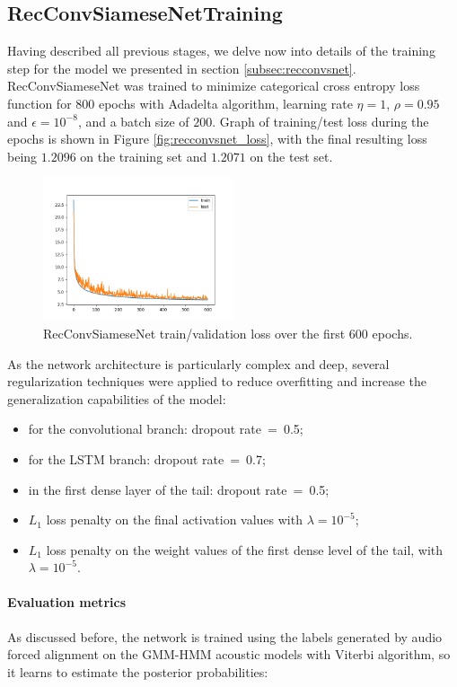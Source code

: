 \subsection{RecConvSiameseNetTraining}\label{subsec:recconvsnet_train}
Having described all previous stages, we delve now into details of the training step for the model we presented in section \vref{subsec:recconvsnet}.
RecConvSiameseNet was trained to minimize categorical cross entropy loss function for $800$ epochs with Adadelta algorithm, learning rate $\eta = 1$, $\rho=0.95$ and $\epsilon=10^{-8}$, and a batch size of $200$. Graph of training/test loss during the epochs is shown in Figure \vref{fig:recconvsnet_loss}, with the final resulting loss being $1.2096$ on the training set and $1.2071$ on the test set.

\begin{figure}
	\includegraphics[width=0.5\textwidth]{images/recconvsnet_graph.png}
	\caption{RecConvSiameseNet train/validation loss over the first 600 epochs.}
	\label{fig:recconvsnet_loss}
\end{figure}
As the network architecture is particularly complex and deep, several regularization techniques were applied to reduce overfitting and increase the generalization capabilities of the model:

\begin{itemize}
	\item for the convolutional branch: dropout rate~=~0.5;
	\item for the LSTM branch: dropout rate~=~0.7;
	\item in the first dense layer of the tail: dropout  rate~=~0.5;
	\item $L_1$ loss penalty  on the final activation values with $\lambda = 10^{-5}$;
	\item $L_1$ loss penalty on the weight values of the first dense level of the tail, with $\lambda = 10^{-5}$.
\end{itemize}

\paragraph{Evaluation metrics}
As discussed before, the network is trained using the labels generated by audio forced alignment on the GMM-HMM acoustic models with Viterbi algorithm, so it learns to estimate the posterior probabilities:

